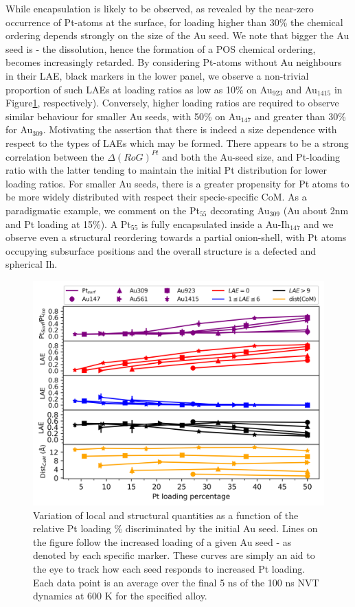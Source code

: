 While encapsulation is likely to be observed, as revealed by the near-zero occurrence of Pt-atoms at the surface, for loading higher than 30\% the chemical ordering depends strongly on the size of the Au seed. We note that bigger the Au seed is - the dissolution, hence the formation of a POS chemical ordering, becomes increasingly retarded. By considering Pt-atoms without Au neighbours in their LAE, black markers in the lower panel, we observe a non-trivial proportion of such LAEs at loading ratios as low as 10\% on Au$_{923}$ and Au$_{1415}$ in Figure\ref{fig:Ptload_Data}, respectively). Conversely, higher loading ratios are required to observe similar behaviour for smaller Au seeds, with 50\% on Au$_{147}$ and greater than 30\% for Au$_{309}$. Motivating the assertion that there is indeed a size dependence with respect to the types of LAEs which may be formed. There appears to be a strong correlation between the $\Delta(RoG)^{Pt}$ and both the Au-seed size, and Pt-loading ratio with the latter tending to maintain the initial Pt distribution for lower loading ratios. For smaller Au seeds, there is a greater propensity for Pt atoms to be more widely distributed with respect their specie-specific CoM. As a paradigmatic example, we comment on the Pt$_{55}$ decorating Au$_{309}$ (Au about 2nm and Pt loading at 15\%). A Pt$_{55}$ is fully encapsulated inside a Au-Ih$_{147}$ and we observe even a structural reordering towards a partial onion-shell, with Pt atoms occupying subsurface positions and the overall structure is a defected and spherical Ih.

\begin{figure}
    \centering
    \includegraphics[width=\linewidth]{figures/MD/Coal/IhData.png}
    \caption{Variation of local and structural quantities as a function of the relative Pt loading \% discriminated by the initial Au seed. Lines on the figure follow the increased loading of a given Au seed - as denoted by each specific marker. These curves are simply an aid to the eye to track how each seed responds to increased Pt loading. Each data point is an average over the final 5 ns of the 100 ns NVT dynamics at 600 K for the specified alloy.}
    \label{fig:Ptload_Data}
\end{figure}

